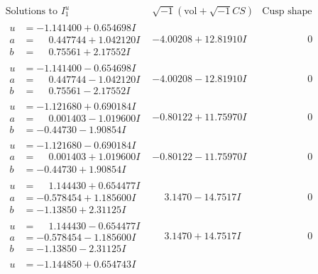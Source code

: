 \documentclass[1p]{elsarticle_modified}
\theoremstyle{definition}
\newcommand{\I}{\sqrt{-1}}
\begin{document}
$$\begin{array}{c|c|c}
\text{Solutions to }I^u_{1}& \I (\text{vol} + \sqrt{-1}CS) & \text{Cusp shape}\\
 \hline 
\begin{aligned}
u &= -1.141400 + 0.654698 I \\
a &= \phantom{-}0.447744 + 1.042120 I \\
b &= \phantom{-}0.75561 + 2.17552 I\end{aligned}
 & -4.00208 + 12.81910 I & \phantom{-0.000000 } 0 \\ \hline\begin{aligned}
u &= -1.141400 - 0.654698 I \\
a &= \phantom{-}0.447744 - 1.042120 I \\
b &= \phantom{-}0.75561 - 2.17552 I\end{aligned}
 & -4.00208 - 12.81910 I & \phantom{-0.000000 } 0 \\ \hline\begin{aligned}
u &= -1.121680 + 0.690184 I \\
a &= \phantom{-}0.001403 - 1.019600 I \\
b &= -0.44730 - 1.90854 I\end{aligned}
 & -0.80122 + 11.75970 I & \phantom{-0.000000 } 0 \\ \hline\begin{aligned}
u &= -1.121680 - 0.690184 I \\
a &= \phantom{-}0.001403 + 1.019600 I \\
b &= -0.44730 + 1.90854 I\end{aligned}
 & -0.80122 - 11.75970 I & \phantom{-0.000000 } 0 \\ \hline\begin{aligned}
u &= \phantom{-}1.144430 + 0.654477 I \\
a &= -0.578454 + 1.185600 I \\
b &= -1.13850 + 2.31125 I\end{aligned}
 & \phantom{-}3.1470 - 14.7517 I & \phantom{-0.000000 } 0 \\ \hline\begin{aligned}
u &= \phantom{-}1.144430 - 0.654477 I \\
a &= -0.578454 - 1.185600 I \\
b &= -1.13850 - 2.31125 I\end{aligned}
 & \phantom{-}3.1470 + 14.7517 I & \phantom{-0.000000 } 0 \\ \hline\begin{aligned}
u &= -1.144850 + 0.654743 I \\

\end{aligned}
\end{array}$$
\end{document}
